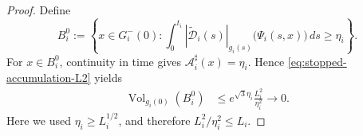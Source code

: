 \documentclass[10pt,a4paper]{amsart}
\begin{document}
\begin{proof}
\noindent
Define
\[
        B_i^0
        :=
        \left\{
        x\in G_i^-(0):
        \int_0^{t_i}
        |\widetilde{\mathcal D}_i(s)|_{g_i(s)}
        \bigl(\Psi_i(s,x)\bigr)\,ds
        \geq\eta_i
        \right\}.
\]
For \(x\in B_i^0\), continuity in time gives
\(\mathcal A_i^\sharp(x)=\eta_i\). Hence
\eqref{eq:stopped-accumulation-L2} yields
\begin{equation}
\label{eq:modified-initial-bad-volume}
\begin{aligned}
        \operatorname{Vol}_{g_i(0)}(B_i^0)
        &\leq
        e^{\sqrt{3}\eta_i}
        \frac{L_i^2}{\eta_i^2}
        \longrightarrow0 .
\end{aligned}
\end{equation}
Here we used \(\eta_i\geq L_i^{1/2}\), and therefore
\(L_i^2/\eta_i^2\leq L_i\).


\end{proof}
\end{document}
